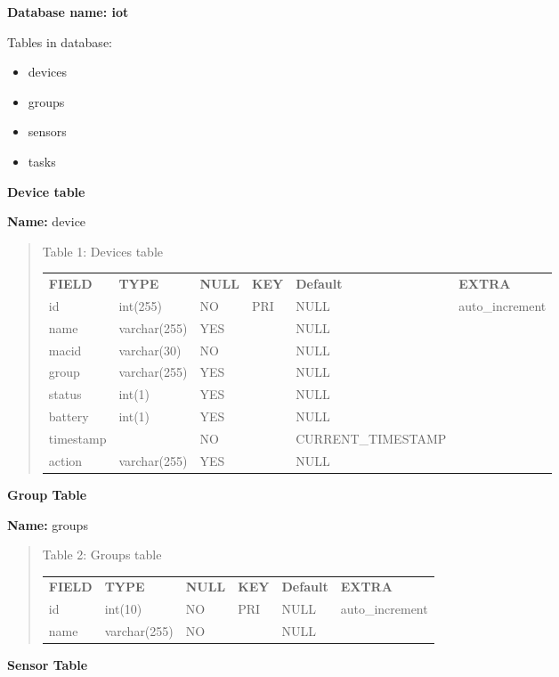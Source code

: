 \documentclass[16pt]{article}
\begin{document}
\textbf{Database name: iot}

Tables in database: 

\begin{itemize}

\item devices
\item groups 
\item sensors
\item tasks  

\end{itemize}

\textbf{Device table}

\textbf{Name:} device

\begin{quote}

	\centering
	\caption{Table 1: Devices table}
	\label{my-label}
	\begin{tabular}{llllll}
		{\bf FIELD} & {\bf TYPE}   & {\bf NULL} & {\bf KEY} & {\bf Default}      & {\bf EXTRA}     \\
		id          & int(255)     & NO         & PRI       & NULL               & auto\_increment \\
		name        & varchar(255) & YES        &           & NULL               &                 \\
		macid       & varchar(30)  & NO         &           & NULL               &                 \\
		group       & varchar(255) & YES        &           & NULL               &                 \\
		status      & int(1)       & YES        &           & NULL               &                 \\
		battery     & int(1)       & YES        &           & NULL               &                 \\
		timestamp   &              & NO         &           & CURRENT\_TIMESTAMP &                 \\
		action      & varchar(255) & YES        &           & NULL               &                
	\end{tabular}
	
\end{quote}
\textbf{Group Table}

\textbf{Name:} groups

\begin{quote}
	\centering
	\caption{Table 2: Groups table}
	\label{my-label}
	\begin{tabular}{llllll}
		{\bf FIELD} & {\bf TYPE}   & {\bf NULL} & {\bf KEY} & {\bf Default} & {\bf EXTRA}     \\
		id          & int(10)      & NO         & PRI       & NULL          & auto\_increment \\
		name        & varchar(255) & NO         &           & NULL          &                
	\end{tabular}

\end{quote}
\textbf{Sensor Table}
\end{document}
